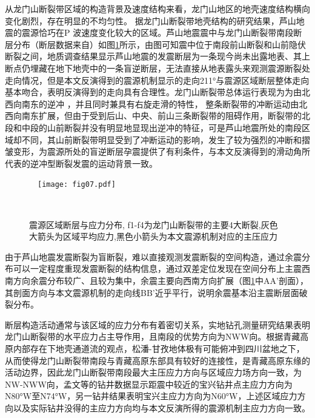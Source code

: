 从龙门山断裂带区域的构造背景及速度结构来看，龙门山地区的地壳速度结构横向变化剧烈，存在明显的不均匀性\citep{Zhang2013,Wang2010,张忠杰2009,雷建设2009,Zhang2011}。 据龙门山断裂带地壳结构的研究结果\citep{雷建设2009}，芦山地震的震源恰巧在P 波速度变化较大的区域。芦山地震震中与龙门山断裂带南段断层分布（断层数据来自\citet{邓起东2002}）如图\ref{fig07}所示，由图可知震中位于南段前山断裂和山前隐伏断裂之间，地质调查结果\citep{徐锡伟2013,徐锡伟2013a}显示芦山地震的发震断层为一条现今尚未出露地表、其上断点仍埋藏在地下地壳中的一条盲逆断层，无法直接从地表露头来观测震源断裂处走向情况，但是本文反演得到的震源机制显示的走向211°与震源区域断层整体走向基本吻合，表明反演得到的走向具有合理性。龙门山断裂带总体运行表现为为由北西向南东的逆冲 ，并且同时兼具有右旋走滑的特性\citep{唐荣昌1991,李勇2006,Densmore2007,陈国光2007}， 整条断裂带的冲断运动由北西向南东扩展，但由于受到后山、中央、前山三条断裂带的阻碍作用，断裂带的北段和中段的山前断裂并没有明显地显现出逆冲的特征，可是芦山地震所处的南段区域却不同，其山前断裂带明显受到了冲断运动的影响，发生了较为强烈的冲断和摺皱变形，为震源所处的盲逆断层孕震提供了有利条件，与本文反演得到的滑动角所代表的逆冲型断裂发震的运动背景一致。
\begin{figure}
\centering
  \texttt{[image: fig07.pdf]}
  \caption{ 震源区域断层与应力分布, f1-f4为龙门山断裂带的主要4大断裂,灰色大箭头为区域平均应力,黑色小箭头为本文震源机制对应的主压应力}
  \label{fig07}
\end{figure}

由于芦山地震发震断裂为盲断裂，难以直接观测发震断裂的空间构造，通过余震分布可以一定程度重现发震断裂的结构信息，\citet{张广伟2013}通过双差定位发现在空间分布上主震西南方向余震分布较广、且较为集中，余震主要向西南方向扩展（图\ref{fig07}中AA'剖面），其剖面方向与本文震源机制的走向线BB'近乎平行，说明余震基本沿主震断层面破裂分布。

断层构造活动通常与该区域的应力分布有着密切关系，\citet{孟文2013}实地钻孔测量研究结果表明龙门山断裂带的水平应力占主导作用，且南段的优势方向为NWW向。根据青藏高原内部存在下地壳通道流的观点\citep{Royden1997,Clark2000,Meng2005,Burchfiel1995,Harris2007}，松潘-甘孜地体极有可能俯冲到四川盆地之下\citep{楼海2010}，从而使得龙门山断裂带南段与青藏高原东部具有较好的连接性，是青藏高原东缘的活动边界，因此龙门山断裂带南段最大主压应力方向与区域应力场方向一致，为NW-NWW向，孟文等的钻井数据显示距震中较近的宝兴钻井点主应力方向为N80°W至N74°W，另一钻井结果表明宝兴主应力方向为N60°W\citep{秦向辉2013}，上述区域应力方向以及实际钻井没得的主应力方向均与本文反演所得的震源机制主应力方向一致。

